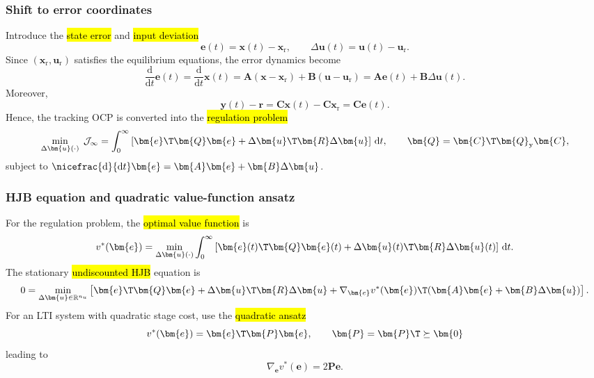 \begin{frame}
	\frametitle{Shift to error coordinates}
	Introduce the \hl{state error} and \hl{input deviation}
	\begin{equation}
		\bm{e}(t)=\bm{x}(t)-\bm{x}_{\mathrm{r}},
		\qquad
		\Delta\bm{u}(t)=\bm{u}(t)-\bm{u}_{\mathrm{r}}.
	\end{equation}\pause%
	Since $(\bm{x}_{\mathrm{r}},\bm{u}_{\mathrm{r}})$ satisfies the equilibrium equations, the error dynamics become
	\begin{equation*}
		\frac{\mathrm{d}}{\mathrm{d}t}\bm{e}(t)
		=\frac{\mathrm{d}}{\mathrm{d}t}\bm{x}(t)
		=\bm{A}(\bm{x}-\bm{x}_{\mathrm{r}})+\bm{B}(\bm{u}-\bm{u}_{\mathrm{r}})
		=\bm{A}\bm{e}(t)+\bm{B}\Delta\bm{u}(t).
	\end{equation*}\pause%
	Moreover,
	\begin{equation}
		\bm{y}(t)-\bm{r}
		=\bm{C}\bm{x}(t)-\bm{C}\bm{x}_{\mathrm{r}}
		=\bm{C}\bm{e}(t).
	\end{equation}\pause%
	Hence, the tracking OCP is converted into the \hl{regulation problem}
	\begin{equation}
		\min_{\Delta\bm{u}(\cdot)}\; \mathcal{J}_\infty
		=\int_0^{\infty}
		\left[\bm{e}\T\bm{Q}\bm{e}+\Delta\bm{u}\T\bm{R}\Delta\bm{u}\right]\,\mathrm{d}t,
		\qquad
		\bm{Q}=\bm{C}\T\bm{Q}_{\mathrm{y}}\bm{C},
	\end{equation}
	subject to $\nicefrac{\mathrm{d}}{\mathrm{d}t}\bm{e}=\bm{A}\bm{e}+\bm{B}\Delta\bm{u}$.
\end{frame}

\begin{frame}
	\frametitle{HJB equation and quadratic value-function ansatz}
	For the regulation problem, the \hl{optimal value function} is
	\begin{equation}
		v^*(\bm{e})
		=\min_{\Delta\bm{u}(\cdot)}
		\int_0^{\infty}
		\left[\bm{e}(t)\T\bm{Q}\bm{e}(t)+\Delta\bm{u}(t)\T\bm{R}\Delta\bm{u}(t)\right]\,\mathrm{d}t.
	\end{equation}\pause%
	The stationary \hl{undiscounted HJB} equation is
	\begin{equation}
		0=\min_{\Delta\bm{u}\in\mathbb{R}^{n_u}}
		\left[\bm{e}\T\bm{Q}\bm{e}+\Delta\bm{u}\T\bm{R}\Delta\bm{u}
			+\nabla_{\bm{e}}v^*(\bm{e})\T(\bm{A}\bm{e}+\bm{B}\Delta\bm{u})\right].
	\end{equation}\pause%
	For an LTI system with quadratic stage cost, use the \hl{quadratic ansatz}
	\begin{equation}
		v^*(\bm{e})=\bm{e}\T\bm{P}\bm{e},
		\qquad
		\bm{P}=\bm{P}\T\succeq\bm{0}
	\end{equation}\pause%
	leading to
	\begin{equation}
		\nabla_{\bm{e}}v^*(\bm{e})=2\bm{P}\bm{e}.
	\end{equation}
\end{frame}

